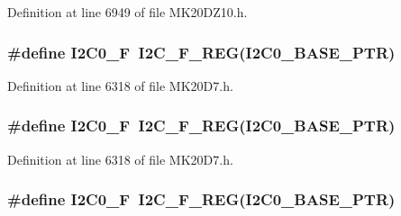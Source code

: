 Definition at line 6949 of file M\+K20\+D\+Z10.\+h.

\subsubsection[{\texorpdfstring{I2\+C0\+\_\+F}{I2C0_F}}]{\setlength{\rightskip}{0pt plus 5cm}\#define I2\+C0\+\_\+F~{\bf I2\+C\+\_\+\+F\+\_\+\+R\+EG}({\bf I2\+C0\+\_\+\+B\+A\+S\+E\+\_\+\+P\+TR})}\hypertarget{group___i2_c___register___accessor___macros_gacd455dbff54b6e42523e833319e562e4}{}\label{group___i2_c___register___accessor___macros_gacd455dbff54b6e42523e833319e562e4}


Definition at line 6318 of file M\+K20\+D7.\+h.

\subsubsection[{\texorpdfstring{I2\+C0\+\_\+F}{I2C0_F}}]{\setlength{\rightskip}{0pt plus 5cm}\#define I2\+C0\+\_\+F~{\bf I2\+C\+\_\+\+F\+\_\+\+R\+EG}({\bf I2\+C0\+\_\+\+B\+A\+S\+E\+\_\+\+P\+TR})}\hypertarget{group___i2_c___register___accessor___macros_gacd455dbff54b6e42523e833319e562e4}{}\label{group___i2_c___register___accessor___macros_gacd455dbff54b6e42523e833319e562e4}


Definition at line 6318 of file M\+K20\+D7.\+h.

\subsubsection[{\texorpdfstring{I2\+C0\+\_\+F}{I2C0_F}}]{\setlength{\rightskip}{0pt plus 5cm}\#define I2\+C0\+\_\+F~{\bf I2\+C\+\_\+\+F\+\_\+\+R\+EG}({\bf I2\+C0\+\_\+\+B\+A\+S\+E\+\_\+\+P\+TR})}\hypertarget{group___i2_c___register___accessor___macros_gacd455dbff54b6e42523e833319e562e4}{}\label{group___i2_c___register___accessor___macros_gacd455dbff54b6e42523e833319e562e4}


